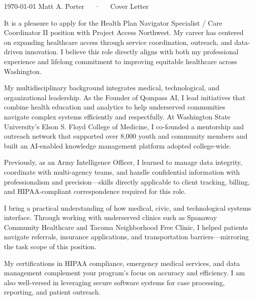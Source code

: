 \documentclass[11pt, a4paper]{cv}
\begin{document}
\makecvheader[R]

\makecvfooter
  {\today}
  {Matt A. Porter~~~·~~~Cover Letter}
  {}

\makelettertitle

\begin{cvletter}

It is a pleasure to apply for the Health Plan Navigator Specialist / Care Coordinator II position with Project Access Northwest. My career has centered on expanding healthcare access through service coordination, outreach, and data-driven innovation. I believe this role directly aligns with both my professional experience and lifelong commitment to improving equitable healthcare across Washington.

My multidisciplinary background integrates medical, technological, and organizational leadership. As the Founder of Qompass AI, I lead initiatives that combine health education and analytics to help underserved communities navigate complex systems efficiently and respectfully. At Washington State University’s Elson S. Floyd College of Medicine, I co-founded a mentorship and outreach network that supported over 8,000 youth and community members and built an AI-enabled knowledge management platform adopted college-wide.  

Previously, as an Army Intelligence Officer, I learned to manage data integrity, coordinate with multi-agency teams, and handle confidential information with professionalism and precision—skills directly applicable to client tracking, billing, and HIPAA-compliant correspondence required for this role.

I bring a practical understanding of how medical, civic, and technological systems interface. Through working with underserved clinics such as Spanaway Community Healthcare and Tacoma Neighborhood Free Clinic, I helped patients navigate referrals, insurance applications, and transportation barriers—mirroring the task scope of this position.  

My certifications in HIPAA compliance, emergency medical services, and data management complement your program’s focus on accuracy and efficiency. I am also well-versed in leveraging secure software systems for case processing, reporting, and patient outreach.


\end{cvletter}
\end{document}
